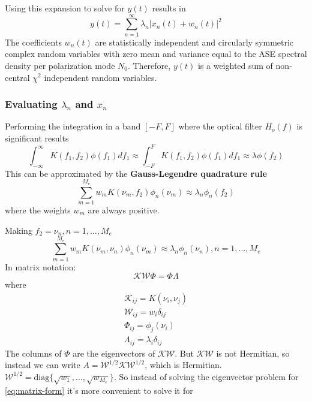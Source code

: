 \documentclass[a4paper]{article}
\begin{document}
Using this expansion to solve for $y(t)$ results in
\begin{equation}
y(t) = \sum_{n=1}^{\infty}\lambda_n|x_n(t) + w_n(t)|^2
\end{equation}
The coefficients $w_n(t)$ are statistically independent and circularly symmetric complex random variables with zero mean and variance equal to the ASE spectral density per polarization mode $N_0$.
Therefore, $y(t)$ is a weighted sum of non-central $\chi^2$ independent random variables.

\subsubsection{Evaluating $\lambda_n$ and $x_n$}
Performing the integration in a band $[-F, F]$ where the optical filter $H_o(f)$ is significant results
\begin{equation}
\int_{-\infty}^{\infty} K(f_1, f_2)\phi(f_1)df_1 \approx \int_{-F}^{F} K(f_1, f_2)\phi(f_1)df_1 \approx \lambda\phi(f_2)
\end{equation}
This can be approximated by the \textbf{Gauss-Legendre quadrature rule}
\begin{equation}
\sum_{m=1}^{M_e}w_mK(\nu_m, f_2)\phi_n(\nu_m) \approx \lambda_n\phi_n(f_2)
\end{equation}
where the weights $w_m$ are always positive.

Making $f_2 = \nu_n, n = 1,\ldots, M_e$
\begin{equation}
\sum_{m=1}^{M_e}w_mK(\nu_m, \nu_n)\phi_n(\nu_m) \approx \lambda_n\phi_n(\nu_n), n = 1,\ldots, M_e
\end{equation}
In matrix notation:
\begin{equation} \label{eq:matrix-form}
\mathcal{K}\mathcal{W}\Phi = \Phi\Lambda
\end{equation}
where 
\begin{align}
\mathcal{K}_{ij} = K(\nu_i, \nu_j) \\
\mathcal{W}_{ij} = w_i\delta_{ij} \\
\Phi_{ij} = \phi_j(\nu_i) \\
\Lambda_{ij} = \lambda_i\delta_{ij}
\end{align}
The columns of $\Phi$ are the eigenvectors of $\mathcal{K}\mathcal{W}$. But $\mathcal{K}\mathcal{W}$ is not Hermitian, so instead we can write $A = \mathcal{W}^{1/2}\mathcal{K}\mathcal{W}^{1/2}$, which is Hermitian. $\mathcal{W}^{1/2} = \mathrm{diag}\{\sqrt{w_1},\ldots,\sqrt{w_{M_e}}\}$. So instead of solving the eigenvector problem for \eqref{eq:matrix-form} it's more convenient to solve it for
\end{document}
